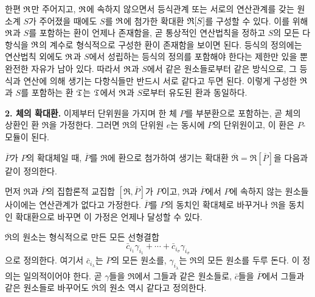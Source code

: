 한편 \(\mathfrak{R}\)만 주어지고, \(\mathfrak{R}\)에 속하지 않으면서 등식관계 또는 서로의 연산관계를 갖는 원소계 \(S\)가 주어졌을 때에도 \(S\)를 \(\mathfrak{R}\)에 첨가한 확대환 \(\mathfrak{R}[S]\)를 구성할 수 있다. 이를 위해 \(\mathfrak{R}\)과 \(S\)를 포함하는 환이 언제나 존재함을, 곧 통상적인 연산법칙을 정하고 \(S\)의 모든 다항식을 \(\mathfrak{R}\)의 계수로 형식적으로 구성한 환이 존재함을 보이면 된다. 등식의 정의에는 연산법칙 외에도 \(\mathfrak{R}\)과 \(S\)에서 성립하는 등식의 정의를 포함해야 한다는 제한만 있을 뿐 완전한 자유가 남아 있다. 따라서 \(\mathfrak{R}\)과 \(S\)에서 같은 원소들로부터 같은 방식으로, 그 등식과 연산에 의해 생기는 다항식들만 반드시 서로 같다고 두면 된다. 이렇게 구성한 \(\mathfrak{R}\)과 \(S\)를 포함하는 환 \(\mathfrak{T}\)는 \(\mathfrak{T}\)에서 \(\mathfrak{R}\)과 \(S\)로부터 유도된 환과 동일하다.

\textbf{2. 체의 확대환.} 이제부터 단위원을 가지며 한 체 \(P\)를 부분환으로 포함하는, 곧 체의 상환인 환 \(\mathfrak R\)을 가정한다. 그러면 \(\mathfrak R\)의 단위원 \(e\)는 동시에 \(P\)의 단위원이고, 이 환은 \(P\)-모듈이 된다.

\(\overline P\)가 \(P\)의 확대체일 때, \(\overline P\)를 \(\mathfrak R\)에 환으로 첨가하여 생기는 확대환 \(\overline{\mathfrak R}=\mathfrak R[\overline P]\)을 다음과 같이 정의한다.

먼저 \(\mathfrak R\)과 \(\overline P\)의 집합론적 교집합 \([\mathfrak R,\overline P]\)가 \(P\)이고, \(\mathfrak R\)과 \(\overline P\)에서 \(P\)에 속하지 않는 원소들 사이에는 연산관계가 없다고 가정한다. \(\overline P\)를 \(P\)의 동치인 확대체로 바꾸거나 \(\mathfrak R\)을 동치인 확대환으로 바꾸면 이 가정은 언제나 달성할 수 있다.

\(\overline{\mathfrak R}\)의 원소는 형식적으로 만든 모든 선형결합
\[
   \bar c_{i_1}\gamma_{i_1}+\cdots+\bar c_{i_\sigma}\gamma_{i_\sigma}
\]
으로 정의한다. 여기서 \(\bar c_{i_\lambda}\)는 \(\overline P\)의 모든 원소를, \(\gamma_{i_\lambda}\)는 \(\mathfrak R\)의 모든 원소를 두루 돈다. 이 정의는 일의적이어야 한다. 곧 \(\gamma\)들을 \(\mathfrak R\)에서 그들과 같은 원소들로, \(\bar c\)들을 \(\overline P\)에서 그들과 같은 원소들로 바꾸어도 \(\overline{\mathfrak R}\)의 원소 역시 같다고 정의한다.

